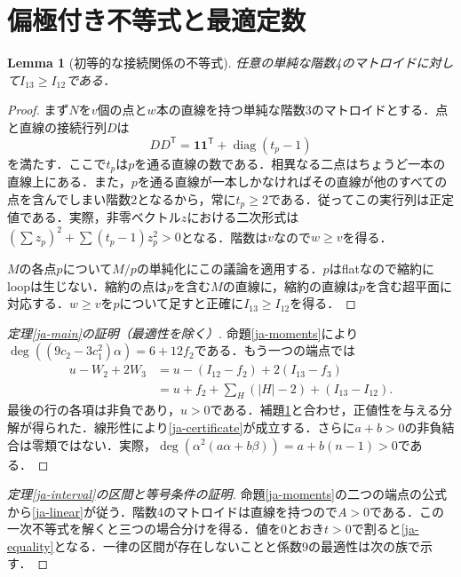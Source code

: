 \documentclass[12pt]{amsart}
\newtheorem{lem}[thm]{Lemma}
\theoremstyle{definition}
\theoremstyle{remark}
\numberwithin{equation}{section}
\begin{document}
\section{偏極付き不等式と最適定数}
\begin{lem}[初等的な接続関係の不等式]\label{ja-incidence}
任意の単純な階数4のマトロイドに対して$I_{13}\geq I_{12}$である．
\end{lem}
\begin{proof}
まず$N$を$v$個の点と$w$本の直線を持つ単純な階数3のマトロイドとする．点と直線の接続行列$D$は
\[
 DD^{\mathsf T}=\mathbf 1\mathbf 1^{\mathsf T}
                         +\operatorname{diag}(t_p-1)
\]
を満たす．ここで$t_p$は$p$を通る直線の数である．相異なる二点はちょうど一本の直線上にある．また，$p$を通る直線が一本しかなければその直線が他のすべての点を含んでしまい階数2となるから，常に$t_p\geq2$である．従ってこの実行列は正定値である．実際，非零ベクトル$z$における二次形式は$(\sum z_p)^2+\sum(t_p-1)z_p^2>0$となる．階数は$v$なので$w\geq v$を得る．

$M$の各点$p$について$M/p$の単純化にこの議論を適用する．$p$はflatなので縮約にloopは生じない．縮約の点は$p$を含む$M$の直線に，縮約の直線は$p$を含む超平面に対応する．$w\geq v$を$p$について足すと正確に$I_{13}\geq I_{12}$を得る．
\end{proof}

\begin{proof}[定理\ref{ja-main}の証明（最適性を除く）]
命題\ref{ja-moments}により$\deg((9c_2-3c_1^2)\alpha)=6+12f_2$である．もう一つの端点では
\begin{align*}
 u-W_2+2W_3
 &=u-(I_{12}-f_2)+2(I_{13}-f_3)\\
 &=u+f_2+\sum_H(|H|-2)+(I_{13}-I_{12}).
\end{align*}
最後の行の各項は非負であり，$u>0$である．補題\ref{ja-incidence}と合わせ，正値性を与える分解が得られた．線形性により\eqref{ja-certificate}が成立する．さらに$a+b>0$の非負結合は零類ではない．実際，$\deg(\alpha^2(a\alpha+b\beta))=a+b(n-1)>0$である．
\end{proof}

\begin{proof}[定理\ref{ja-interval}の区間と等号条件の証明]
命題\ref{ja-moments}の二つの端点の公式から\eqref{ja-linear}が従う．階数4のマトロイドは直線を持つので$A>0$である．この一次不等式を解くと三つの場合分けを得る．値を0とおき$t>0$で割ると\eqref{ja-equality}となる．一律の区間が存在しないことと係数9の最適性は次の族で示す．
\end{proof}
\end{document}
